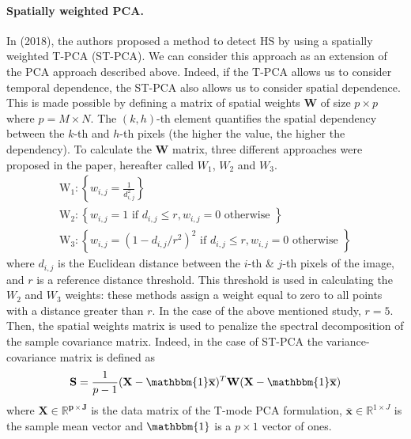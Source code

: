 \paragraph{Spatially weighted PCA.} In \citeauthor{colosimo_spatially_2018} (2018), the authors proposed a method to detect HS by using a spatially weighted T-PCA (ST-PCA). We can consider this approach as an extension of the PCA approach described above. Indeed, if the T-PCA allows us to consider temporal dependence, the ST-PCA also allows us to consider spatial dependence. This is made possible by defining a matrix of spatial weights $\mathbf{W}$ of size $p\times p$ where $p = M \times N$. The $(k,h)$-th element quantifies the spatial dependency between the $k$-th and $h$-th pixels (the higher the value, the higher the dependency). To calculate the $\mathbf{W}$ matrix, three different approaches were proposed in the paper, hereafter called $W_1$, $W_2$ and $W_3$.
\begin{equation}
    \begin{gathered}
\mathrm{W}_1:\left\{w_{i, j}=\frac{1}{d_{i, j}^2}\right\} \\[0.3cm]
\mathrm{W}_2:\left\{w_{i, j}=1 \text { if } d_{i, j} \leq r, w_{i, j}=0 \text { otherwise }\right\} \\[0.3cm]
\mathrm{W}_3:\left\{w_{i, j}=\left(1-d_{i, j} / r^2\right)^2 \text { if } d_{i, j} \leq r, w_{i, j}=0 \text { otherwise }\right\}
\end{gathered}
\end{equation}
where $d_{i, j}$ is the Euclidean distance between the $i$-th \& $j$-th pixels of the image, and $r$ is a reference distance threshold. This threshold is used in calculating the $W_2$ and $W_3$ weights: these methods assign a weight equal to zero to all points with a distance greater than $r$. In the case of the above mentioned study, $r=5$. Then, the spatial weights matrix is used to penalize the spectral decomposition of the sample covariance matrix. Indeed, in the case of ST-PCA the variance-covariance matrix is defined as
\begin{equation}
    \mathbf{S}=  \frac{1}{p-1}(\mathbf{X}-\mathbbm{1} \overline{\mathbf{x}})^T \mathbf{W}(\mathbf{X}-\mathbbm{1} \overline{\mathbf{x}})
\end{equation}
where $\mathbf{X} \in \mathbb{R}^{\boldsymbol{p} \times \boldsymbol{J}}$ is the data matrix of the T-mode PCA formulation, $\overline{\mathbf{x}} \in \mathbb{R}^{1 \times J}$ is the sample mean vector and $\mathbbm{1}$ is a $p \times 1$ vector of ones.
